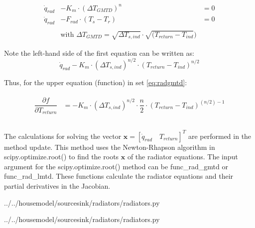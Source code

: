 {\color{blue}
	\begin{equation}
		\label{eq:radgmtd}
		\begin{aligned}
			\dot{q}_{rad} &- K_m \cdot (\Delta T_{GMTD})^n &= 0 \\
			\dot{q}_{rad} &- F_{rad} \cdot (T_{s} - T_{r}) &= 0 \\ \\
			&\text{with } \Delta T_{GMTD} = \sqrt{\Delta T_{s,ind}} \cdot  \sqrt{(T_{return} - T_{ind}})
		\end{aligned}
	\end{equation}
}

Note the left-hand side of the first equation can be written as:
$$ \dot{q}_{rad} - K_{m} \cdot \left(\Delta T_{s,ind}\right)^{n/2} \cdot \left(T_{return} - T_{ind}\right)^{n/2} $$

Thus, for the upper equation (function) in set \ref{eq:radgmtd}:

\begin{equation}
	\begin{aligned}
		\begin{matrix}
			\dfrac{\partial f}{\partial T_{return}} &= - K_{m} \cdot \left(\Delta T_{s,ind}\right)^{n/2} \cdot \dfrac{n}{2} \cdot \left(T_{return} - T_{ind}\right)^{(n/2)-1} \\ \\
		\end{matrix}
	\end{aligned}
\end{equation} 

The calculations for solving the vector $\mathbf{x} = [\dot{q}_{rad} \quad T_{return}]^T$ are performed in the method \textsf{update}. This method uses the Newton-Rhapson algorithm in \textsf{scipy.optimize.root()} to find the roots $\mathbf{x}$ of the radiator equations.
The input argument for the \textsf{scipy.optimize.root()} method can be \textsf{func\_rad\_gmtd} or \textsf{func\_rad\_lmtd}. These functions calculate the radiator equations and their partial derivatives in the Jacobian.

 
{../../housemodel/sourcesink/radiators/radiators.py}


{../../housemodel/sourcesink/radiators/radiators.py}

